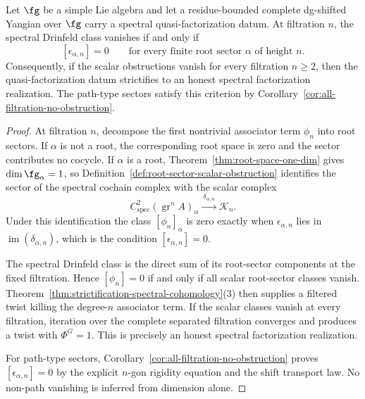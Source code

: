 \begin{theorem}
\label{thm:complete-strictification}
Let $\fg$ be a simple Lie algebra and let a residue-bounded complete
dg-shifted Yangian over $\fg$ carry a spectral quasi-factorization
datum. At filtration $n$, the spectral Drinfeld class vanishes if and
only if
\[
[\epsilon_{\alpha,n}]=0
\qquad
\text{for every finite root sector }\alpha\text{ of height }n.
\]
Consequently, if the scalar obstructions vanish for every filtration
$n\ge 2$, then the quasi-factorization datum strictifies to an honest
spectral factorization realization. The path-type sectors satisfy this
criterion by Corollary~\ref{cor:all-filtration-no-obstruction}.
\end{theorem}

\begin{proof}
At filtration $n$, decompose the first nontrivial associator term
$\phi_n$ into root sectors. If $\alpha$ is not a root, the
corresponding root space is zero and the sector contributes no cocycle.
If $\alpha$ is a root, Theorem~\ref{thm:root-space-one-dim} gives
$\dim\fg_\alpha=1$, so
Definition~\ref{def:root-sector-scalar-obstruction} identifies the
sector of the spectral cochain complex with the scalar complex
\[
C^2_{\mathrm{spec}}(\operatorname{gr}^nA)_\alpha
\xrightarrow{\ \delta_{\alpha,n}\ }
\mathscr K_n .
\]
Under this identification the class $[\phi_n]_\alpha$ is zero exactly
when $\epsilon_{\alpha,n}$ lies in
$\operatorname{im}(\delta_{\alpha,n})$, which is the condition
$[\epsilon_{\alpha,n}]=0$.

The spectral Drinfeld class is the direct sum of its root-sector
components at the fixed filtration. Hence $[\phi_n]=0$ if and only if
all scalar root-sector classes vanish.
Theorem~\ref{thm:strictification-spectral-cohomology}(3) then supplies
a filtered twist killing the degree-$n$ associator term. If the scalar
classes vanish at every filtration, iteration over the complete
separated filtration converges and produces a twist with $\Phi^G=1$.
This is precisely an honest spectral factorization realization.

For path-type sectors, Corollary~\ref{cor:all-filtration-no-obstruction}
proves $[\epsilon_{\alpha,n}]=0$ by the explicit $n$-gon rigidity
equation and the shift transport law. No non-path vanishing is inferred
from dimension alone.
\end{proof}

